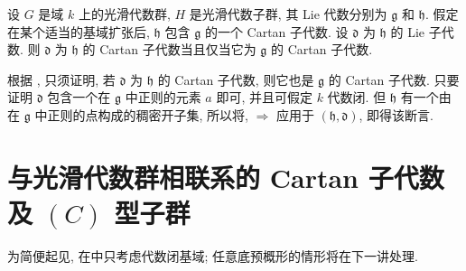 \begin{corollary}
设 \(G\) 是域 \(k\) 上的光滑代数群, \(H\) 是光滑代数子群, 其 Lie 代数分别为 \(\mathfrak g\) 和 \(\mathfrak h\). 假定在某个适当的基域扩张后, \(\mathfrak h\) 包含 \(\mathfrak g\) 的一个 Cartan 子代数. 设 \(\mathfrak d\) 为 \(\mathfrak h\) 的 Lie 子代数. 则 \(\mathfrak d\) 为 \(\mathfrak h\) 的 Cartan 子代数当且仅当它为 \(\mathfrak g\) 的 Cartan 子代数.
\end{corollary}

根据 , 只须证明, 若 \(\mathfrak d\) 为 \(\mathfrak h\) 的 Cartan 子代数, 则它也是 \(\mathfrak g\) 的 Cartan 子代数. 只要证明 \(\mathfrak d\) 包含一个在 \(\mathfrak g\) 中正则的元素 \(a\) 即可, 并且可假定 \(k\) 代数闭. 但 \(\mathfrak h\) 有一个由在 \(\mathfrak g\) 中正则的点构成的稠密开子集, 所以将, \(\Rightarrow\) 应用于 \((\mathfrak h,\mathfrak d)\), 即得该断言.

\section{与光滑代数群相联系的 Cartan 子代数及 \texorpdfstring{\((C)\)}{(C)} 型子群}

为简便起见, 在中只考虑代数闭基域; 任意底预概形的情形将在下一讲处理.

